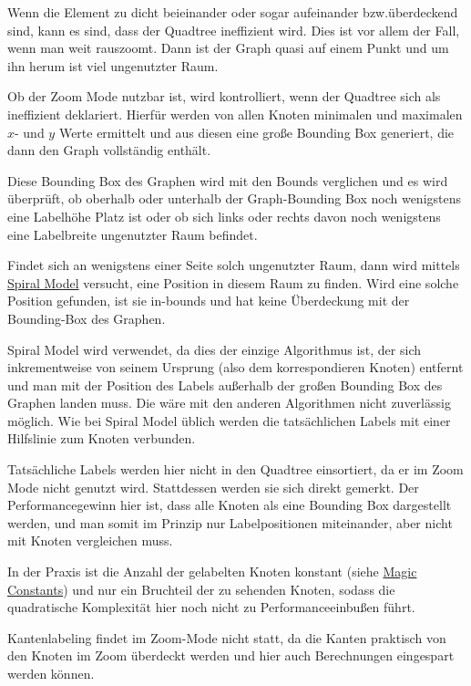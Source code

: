
Wenn die Element zu dicht beieinander oder sogar aufeinander bzw.überdeckend sind, kann es sind, dass der Quadtree ineffizient wird.
Dies ist vor allem der Fall, wenn man weit rauszoomt.
Dann ist der Graph quasi auf einem Punkt und um ihn herum ist viel ungenutzter Raum.

Ob der Zoom Mode nutzbar ist, wird kontrolliert, wenn der Quadtree sich als ineffizient deklariert.
Hierfür werden von allen Knoten minimalen und maximalen $x$- und $y$ Werte ermittelt und
aus diesen eine große Bounding Box generiert, die dann den Graph vollständig enthält.

Diese Bounding Box des Graphen wird mit den Bounds verglichen und es wird überprüft, ob
oberhalb oder unterhalb der Graph-Bounding Box noch wenigstens eine Labelhöhe Platz ist oder
ob sich links oder rechts davon noch wenigstens eine Labelbreite ungenutzter Raum befindet.

Findet sich an wenigstens einer Seite solch ungenutzter Raum, dann wird mittels \hyperref[subsubsec:spiral]{Spiral Model} versucht, eine Position in diesem Raum zu finden.
Wird eine solche Position gefunden, ist sie in-bounds und hat keine Überdeckung mit der Bounding-Box des Graphen.

Spiral Model wird verwendet, da dies der einzige Algorithmus ist, der sich inkrementweise von seinem Ursprung (also dem korrespondieren Knoten) entfernt und man mit der Position des Labels
außerhalb der großen Bounding Box des Graphen landen muss.
Die wäre mit den anderen Algorithmen nicht zuverlässig möglich.
Wie bei Spiral Model üblich werden die tatsächlichen Labels mit einer Hilfslinie zum Knoten verbunden.

Tatsächliche Labels werden hier nicht in den Quadtree einsortiert, da er im Zoom Mode nicht genutzt wird. Stattdessen werden sie sich direkt gemerkt.
Der Performancegewinn hier ist, dass alle Knoten als eine Bounding Box dargestellt werden, und man somit im Prinzip nur Labelpositionen miteinander, aber nicht mit Knoten vergleichen muss.

In der Praxis ist die Anzahl der gelabelten Knoten konstant (siehe \hyperref[subsec:consts]{Magic Constants}) und nur ein Bruchteil der zu sehenden Knoten,
sodass die quadratische Komplexität hier noch nicht zu Performanceeinbußen führt.

Kantenlabeling findet im Zoom-Mode nicht statt, da die Kanten praktisch von den Knoten im Zoom überdeckt werden und hier auch Berechnungen eingespart werden können.
